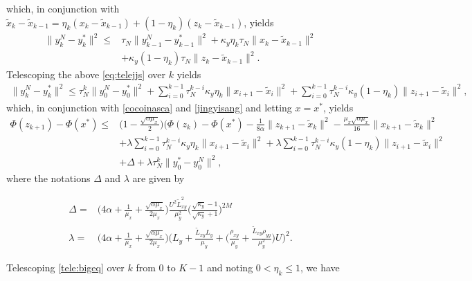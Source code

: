 \documentclass{osudissert96}
\begin{document}
which, in conjunction with $\widetilde x_k - \widetilde x_{k-1}= \eta_k (x_k-\widetilde x_{k-1}) + (1-\eta_k)(z_k - \widetilde x_{k-1})$, yields
\begin{align}\label{eq:telejjs}
\|y_k^N-y_k^*\|^2 \leq & \tau_N \|y_{k-1}^N-y_{k-1}^*\|^2+ \kappa_y\eta_k\tau_N\|x_k-\widetilde x_{k-1}\|^2 \nonumber
\\& +\kappa_y(1-\eta_k)\tau_N \|z_k-\widetilde x_{k-1}\|^2.
\end{align} 
Telescoping the above \cref{eq:telejjs} over $k$ yields
{\small\begin{align*}
\|y_k^N-y_k^*\|^2\leq \tau_N^k\| y_0^N-y_0^*  \|^2 + \sum_{i=0}^{k-1}\tau_N^{k-i}\kappa_y\eta_k\|x_{i+1}-\widetilde x_{i}\|^2  +\sum_{i=0}^{k-1}\tau_N^{k-i}\kappa_y(1-\eta_k)\|z_{i+1}-\widetilde x_{i}\|^2, 
\end{align*}}
\hspace{-0.13cm}which, in conjunction with \cref{cocoinasca} and \cref{jingyisang} and letting $x=x^*$, yields
{\small\begin{align}\label{tele:bigeq}
\Phi(z_{k+1})-\Phi(x^*)\leq & \big(1-\frac{\sqrt{\alpha\mu_x}}{2}\big) (\Phi(z_k) -\Phi(x^*)-\frac{1}{8\alpha} \|z_{k+1}-\widetilde x_k\|^2 - \frac{\mu_x\sqrt{\alpha\mu_x}}{16} \|x_{k+1}-\widetilde x_k\|^2 \nonumber
\\&+ \lambda\sum_{i=0}^{k-1}\tau_N^{k-i}\kappa_y\eta_k\|x_{i+1}-\widetilde x_{i}\|^2  +\lambda\sum_{i=0}^{k-1}\tau_N^{k-i}\kappa_y(1-\eta_k)\|z_{i+1}-\widetilde x_{i}\|^2 \nonumber
\\&+\Delta+ \lambda \tau_N^k \|y_0^*-y_0^N\|^2,
\end{align}}
\hspace{-0.13cm}where the  notations $\Delta$ and $\lambda$ are given by 
\begin{small}
\begin{align}\label{def:lambda}
\Delta =& \Big(4\alpha+\frac{1}{\mu_x} +\frac{\sqrt{\alpha\mu_x}}{2\mu_x}\Big)\frac{U^2\widetilde L^2_{xy}}{\mu^2_y}\Big(\frac{\sqrt{\kappa_y}-1}{\sqrt{\kappa_y}+1}\Big)^{2M} \nonumber
\\\lambda =& \Big(4\alpha+\frac{1}{\mu_x} +\frac{\sqrt{\alpha\mu_x}}{2\mu_x}\Big) \Big(L_y +\frac{\widetilde L_{xy}L_y}{\mu_y} +\Big(\frac{\rho_{xy}}{\mu_y}+\frac{\widetilde L_{xy}\rho_{yy}}{\mu_y^2}\Big)U\Big)^2.
\end{align}
\end{small}
\hspace{-0.12cm} Telescoping \cref{tele:bigeq} over $k$ from $0$ to $K-1$ and noting $0<\eta_k\leq 1$, we have 
\end{document}
